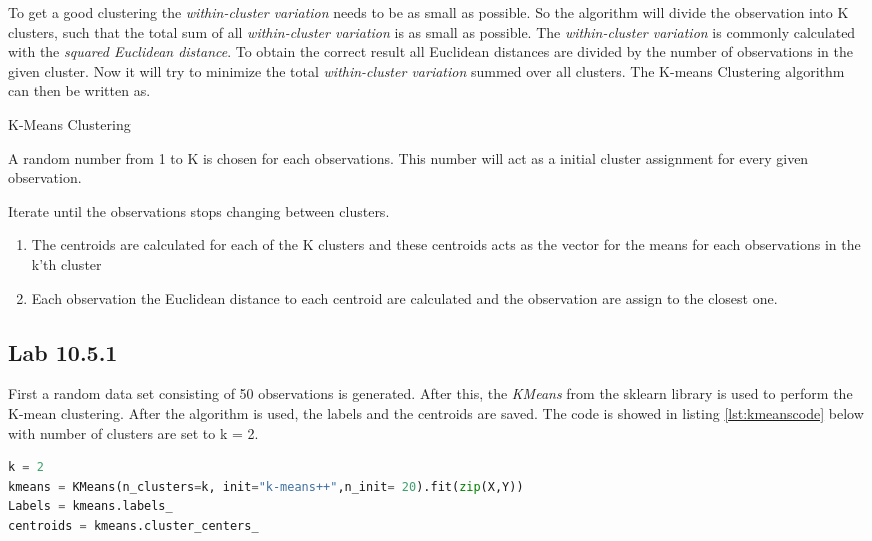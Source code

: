 To get a good clustering the \emph{within-cluster variation} needs to be as small as possible. So the algorithm will divide the observation into K clusters, such that the total sum of all \emph{within-cluster variation} is as small as possible. The \emph{within-cluster variation} is commonly calculated with the \emph{squared Euclidean distance}. To obtain the correct result all Euclidean distances are divided by the number of observations in the given cluster. Now it will try to minimize the total \emph{within-cluster variation} summed over all clusters.
The K-means Clustering algorithm can then be written as.

\begin{algorithm}
	\caption{K-Means Clustering}
	\label{algo:KMeansClustering}
	\begin{algorithmic}[1]
		\State A random number from 1 to K is chosen for each observations. This number will act as a initial cluster assignment for every given observation.
		
		\State 
		Iterate until the observations stops changing between clusters.
		\begin{enumerate}[label=(\alph*)]
			\item The centroids are calculated for each of the K clusters and these centroids acts as the vector for the means for each observations in the k'th cluster
			
			\item Each observation the Euclidean distance to each centroid are calculated and the observation are assign to the closest one.
		\end{enumerate}
	\end{algorithmic}
\end{algorithm}

\subsection{Lab 10.5.1}
First a random data set consisting of 50 observations is generated. After this, the \emph{KMeans} from the sklearn library is used to perform the K-mean clustering.
After the algorithm is used, the labels and the centroids are saved. The code is showed in listing \ref{lst:kmeanscode} below with number of clusters are set to k = 2.
\begin{lstlisting}[language=Python, label=lst:kmeanscode, caption=The KMean function and the code which saves the labels and the centroids]
k = 2
kmeans = KMeans(n_clusters=k, init="k-means++",n_init= 20).fit(zip(X,Y))
Labels = kmeans.labels_
centroids = kmeans.cluster_centers_
\end{lstlisting}

